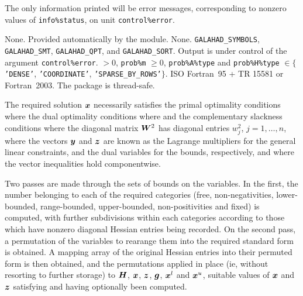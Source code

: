\documentclass{galahad}
\begin{document}

\galinfo
The only information printed will be error messages, corresponding to 
nonzero values of {\tt info\%status}, on unit {\tt control\%error}. 


\galgeneral

\galcommon None.
\galworkspace Provided automatically by the module.
\galroutines None. 
\galmodules 
{\tt GALAHAD\_SY\-M\-BOLS}, 
{\tt GALAHAD\_SMT}, 
{\tt GALAHAD\_QPT},
and {\tt GALAHAD\_SORT}.
\galio Output is under control of the argument {\tt control\%error}.
 $> 0$, {\tt prob\%m} $\geq  0$, 
{\tt prob\%A\%type} and {\tt prob\%H\%type} $\in \{${\tt 'DENSE'}, 
 {\tt 'COORDINATE'}, {\tt 'SPARSE\_BY\_ROWS'}$\}$. 
\galportability ISO Fortran~95 + TR 15581 or Fortran~2003. The package is thread-safe.


\galmethod
The required solution ${\bm{x}}$ necessarily satisfies 
the primal optimality conditions
where
the dual optimality conditions
where
and the complementary slackness conditions 
where the diagonal matrix ${\bm{W}}^{2}$ has diagonal entries $w_{j}^{2}$,
$j = 1, \ldots , n$, where the vectors ${\bm{y}}$ and ${\bm{z}}$ are 
known as the Lagrange multipliers for
the general linear constraints, and the dual variables for the bounds,
respectively, and where the vector inequalities hold componentwise.

Two passes are made through the sets of bounds on the variables. 
In the first, the number belonging to each of the required categories 
(free, non-negativities, lower-bounded, range-bounded, 
upper-bounded, non-positivities and fixed) is computed, with further 
subdivisions within each categories according to those which have 
nonzero diagonal Hessian entries being recorded. On the second pass, a 
permutation of the variables to rearange them into the required standard form 
is obtained. A mapping array of the original Hessian entries into their 
permuted form is then obtained, and the permutations applied in place 
(ie, without resorting to further storage) to ${\bm{H}}$, ${\bm{x}}$, ${\bm{z}}$, ${\bm{g}}$, 
${\bm{x}}^l$ and ${\bm{x}}^u$, suitable values of ${\bm{x}}$ and ${\bm{z}}$ 
satisfying  and  having optionally been computed. 
 
\end{document}
